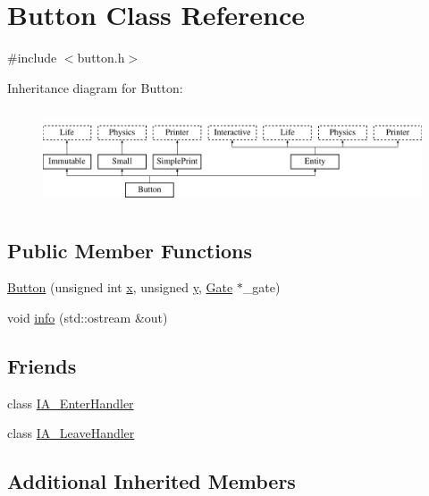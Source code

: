 \hypertarget{class_button}{\section{Button Class Reference}
\label{class_button}
}


{\ttfamily \#include $<$button.\-h$>$}

Inheritance diagram for Button\-:\begin{figure}[H]
\begin{center}
\leavevmode
\includegraphics[height=2.891566cm]{class_button}
\end{center}
\end{figure}
\subsection*{Public Member Functions}
\begin{DoxyCompactItemize}
\item 
\hyperlink{class_button_ad6d31876c1b6fd811ed94e52a97e806c}{Button} (unsigned int \hyperlink{class_entity_afa8f48eccdb09a290e2c1ded3f135363}{x}, unsigned \hyperlink{class_entity_a9d39843430829a89bb8233dbaadae4f1}{y}, \hyperlink{class_gate}{Gate} $\ast$\-\_\-gate)
\item 
void \hyperlink{class_button_aba3d89d8caf373ced3f69f24ad09682a}{info} (std\-::ostream \&out)
\end{DoxyCompactItemize}
\subsection*{Friends}
\begin{DoxyCompactItemize}
\item 
class \hyperlink{class_button_ad46435fe6b8e9a384d33d608058862ae}{I\-A\-\_\-\-Enter\-Handler}
\item 
class \hyperlink{class_button_adc4c20007ad2fd4bc2556fbfbff54945}{I\-A\-\_\-\-Leave\-Handler}
\end{DoxyCompactItemize}
\subsection*{Additional Inherited Members}


